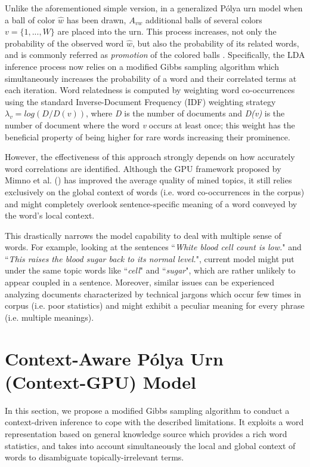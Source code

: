 \documentclass[letterpaper]{article}
\begin{document}
Unlike the aforementioned simple version, in a generalized P\'{o}lya urn model when a ball of color $\hat{w}$ has been drawn, $A_{vw}$ additional balls of several colors $v=\{1,...,W\}$ are placed into the urn. This process increases, not only the probability of the observed word $\hat{w}$, but also the probability of its related words, and is commonly referred as \textit{promotion} of the colored balls \cite{Fei14}.
Specifically, the LDA inference process now relies on a modified Gibbs sampling algorithm which simultaneously increases the probability of a word and their correlated terms at each iteration. Word relatedness is computed by weighting word co-occurrences using the standard Inverse-Document Frequency (IDF) weighting strategy $\lambda_v = log(D/D(v))$, where \textit{D} is the number of documents and \textit{D(v)} is the number of document where the word \textit{v} occurs at least once; this weight has the beneficial property of being higher for rare words increasing their prominence.

However, the effectiveness of this approach strongly depends on how accurately word correlations are identified.
Although the GPU framework proposed by  Mimno et al. (\citeyear{Mimno11}) has improved the average quality of mined topics, it still relies exclusively on the global context of words (i.e. word co-occurrences in the corpus) and might completely overlook sentence-specific meaning of a word conveyed by the word's local context.

This drastically narrows the model capability to deal with multiple sense of words. For example, looking at the sentences ``\emph{White blood cell count is low.}" and ``\emph{This raises the blood sugar back to its normal level.}", current model might put under the same topic words like ``\emph{cell}" and ``\emph{sugar}", which are rather unlikely to appear coupled in a sentence. Moreover, similar issues can be experienced analyzing documents characterized by technical jargons which occur few times in corpus (i.e. poor statistics) and might exhibit a peculiar meaning for every phrase (i.e. multiple meanings).

\section{Context-Aware P\'{o}lya Urn  (Context-GPU) Model}

In this section, we propose a modified Gibbs sampling algorithm to conduct a context-driven inference to cope with the described limitations. It exploits a word representation based on general knowledge source which provides a rich word statistics, and takes into account simultaneously the local and global context of words to disambiguate topically-irrelevant terms.
\end{document}
